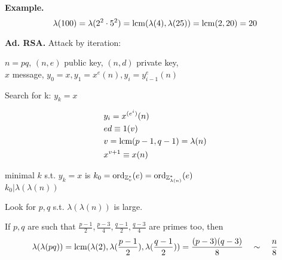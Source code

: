 \textbf{Example.}
\[
  \lambda(100) = \lambda(2^2 \cdot 5^2) = \operatorname{lcm}(\lambda(4), \lambda(25)) = \operatorname{lcm}(2,20) = 20
\]

\textbf{Ad. RSA.}
Attack by iteration:

$n = pq$, $(n,e)$ public key, $(n,d)$ private key, \\
$x$ message, $y_0 = x, y_1 = x^e (n), y_i = y_{i-1}^{e} (n)$

Search for k: $y_k = x$

\begin{align*}
  &y_i = x^{(e^i)} (n) \\
  &ed \equiv 1 (v) \\
  &v = \operatorname{lcm}(p-1, q-1) = \lambda(n) \\
  &x ^{v+1} \equiv x (n)
\end{align*}

minimal $k$ s.t. $ y_k = x$ is $k_0 = \operatorname{ord}_{\mathbb{Z}_v^{*}}(e) = \operatorname{ord}_{\mathbb{Z}_{\lambda(n)}^{*}}(e)$ \\
$k_0 | \lambda(\lambda(n))$

Look for $p,q$ s.t. $\lambda(\lambda(n))$ is large.

If $p,q$ are such that $\frac{p-1}{2}, \frac{p-3}{4}, \frac{q-1}{2}, \frac{q-3}{4}$ are primes too,
then
\begin{align*}
  \lambda(\lambda(pq)) = \operatorname{lcm}(\lambda(2), \lambda( \frac{p-1}{2} ), \lambda( \frac{q-1}{2} )) = \frac{(p-3)(q-3)}{8} \quad \sim \quad \frac{n}{8}
\end{align*}
